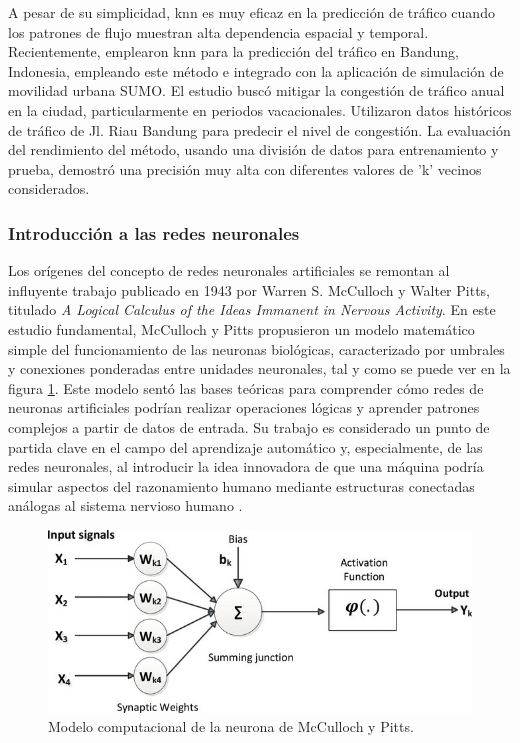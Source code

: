 A pesar de su simplicidad, \acrshort{knn} es muy eficaz en la predicción de tráfico cuando los patrones de flujo muestran alta dependencia espacial y temporal. Recientemente, \cite{forecastKnn} emplearon \acrshort{knn} para la predicción del tráfico en Bandung, Indonesia, empleando este método e integrado con la aplicación de simulación de movilidad urbana SUMO. El estudio buscó mitigar la congestión de tráfico anual en la ciudad, particularmente en periodos vacacionales. Utilizaron datos históricos de tráfico de Jl. Riau Bandung para predecir el nivel de congestión. La evaluación del rendimiento del método, usando una división de datos para entrenamiento y prueba, demostró una precisión muy alta con diferentes valores de 'k' vecinos considerados.

\subsubsection{Introducción a las redes neuronales}

Los orígenes del concepto de redes neuronales artificiales se remontan al influyente trabajo publicado en 1943 por Warren S. McCulloch y Walter Pitts, titulado \textit{A Logical Calculus of the Ideas Immanent in Nervous Activity}. En este estudio fundamental, McCulloch y Pitts propusieron un modelo matemático simple del funcionamiento de las neuronas biológicas, caracterizado por umbrales y conexiones ponderadas entre unidades neuronales, tal y como se puede ver en la figura \ref{fig:neuron}. Este modelo sentó las bases teóricas para comprender cómo redes de neuronas artificiales podrían realizar operaciones lógicas y aprender patrones complejos a partir de datos de entrada. Su trabajo es considerado un punto de partida clave en el campo del aprendizaje automático y, especialmente, de las redes neuronales, al introducir la idea innovadora de que una máquina podría simular aspectos del razonamiento humano mediante estructuras conectadas análogas al sistema nervioso humano \cite{mccullochPitts1943}.

\begin{figure}[h]
	\centering
	\includegraphics[scale=0.5]{includes/McCulloch-Pitts-computational-model-of-a-neuron_W640.jpg}
	\caption[Modelo computacional de la neurona de McCulloch y Pitts. Fuente: \url{https://www.researchgate.net/publication/323465059_Modulation_Format_Recognition_Using_Artificial_Neural_Networks_for_the_Next_Generation_Optical_Networks}]{Modelo computacional de la neurona de McCulloch y Pitts.}
	\label{fig:neuron}
\end{figure}

